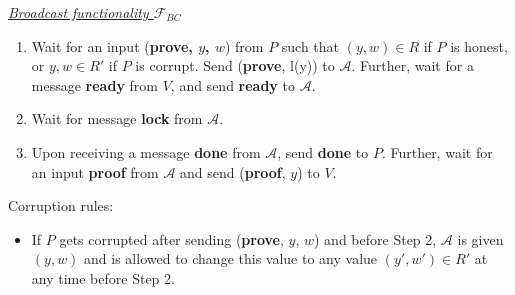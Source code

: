 \begin{tcolorbox}[colback=white, arc=5pt]
    \noindent\emph{\underline{Broadcast functionality $\mathcal{F}_{BC}$}}\\[5pt]
    \begin{enumerate}
        \item Wait for an input (\textbf{prove, $y$, $w$}) from $P$ such that $(y,w)\in R$ if $P$ is honest, or ${y,w}\in R'$ if $P$ is corrupt. Send (\textbf{prove}, l(y)) to $\mathcal{A}$. Further, wait for a message \textbf{ready} from $V$, and send \textbf{ready} to $\mathcal{A}$.
        \item  Wait for message \textbf{lock} from $\mathcal{A}$.
        \item Upon receiving a message \textbf{done} from $\mathcal{A}$, send \textbf{done} to $P$. Further, wait for an input \textbf{proof} from $\mathcal{A}$ and send (\textbf{proof}, $y$) to $V$.
    \end{enumerate}

    Corruption rules:
    \begin{itemize}
        \item If $P$ gets corrupted after sending (\textbf{prove}, $y$, $w$) and before Step 2, $\mathcal{A}$ is given $(y, w)$ and is allowed to change this value to any value $(y',w')\in R'$ at any time before Step 2. 
    \end{itemize}
    
    \end{tcolorbox}
    \label{fig:zk_functionality}